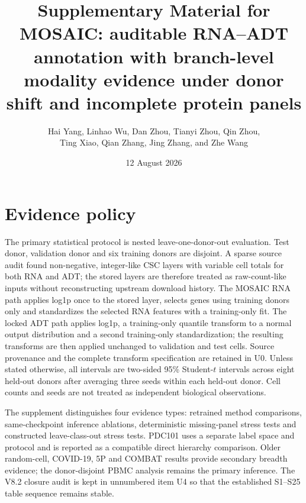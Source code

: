 \documentclass[10pt]{article}
\title{Supplementary Material for\\
MOSAIC: auditable RNA--ADT annotation with branch-level modality evidence under donor shift and incomplete protein panels}
\author{Hai Yang, Linhao Wu, Dan Zhou, Tianyi Zhou, Qin Zhou,\\
Ting Xiao, Qian Zhang, Jing Zhang, and Zhe Wang}
\date{12 August 2026}
\begin{document}
\maketitle

\section{Evidence policy}

The primary statistical protocol is nested leave-one-donor-out evaluation. Test donor, validation donor and six training donors are disjoint. A sparse source audit found non-negative, integer-like CSC layers with variable cell totals for both RNA and ADT; the stored layers are therefore treated as raw-count-like inputs without reconstructing upstream download history. The MOSAIC RNA path applies log1p once to the stored layer, selects genes using training donors only and standardizes the selected RNA features with a training-only fit. The locked ADT path applies log1p, a training-only quantile transform to a normal output distribution and a second training-only standardization; the resulting transforms are then applied unchanged to validation and test cells. Source provenance and the complete transform specification are retained in U0. Unless stated otherwise, all intervals are two-sided 95\% Student-$t$ intervals across eight held-out donors after averaging three seeds within each held-out donor. Cell counts and seeds are not treated as independent biological observations.

The supplement distinguishes four evidence types: retrained method comparisons, same-checkpoint inference ablations, deterministic missing-panel stress tests and constructed leave-class-out stress tests. PDC101 uses a separate label space and protocol and is reported as a compatible direct hierarchy comparison. Older random-cell, COVID-19, 5P and COMBAT results provide secondary breadth evidence; the donor-disjoint PBMC analysis remains the primary inference. The V8.2 closure audit is kept in unnumbered item U4 so that the established S1--S25 table sequence remains stable.
\end{document}

